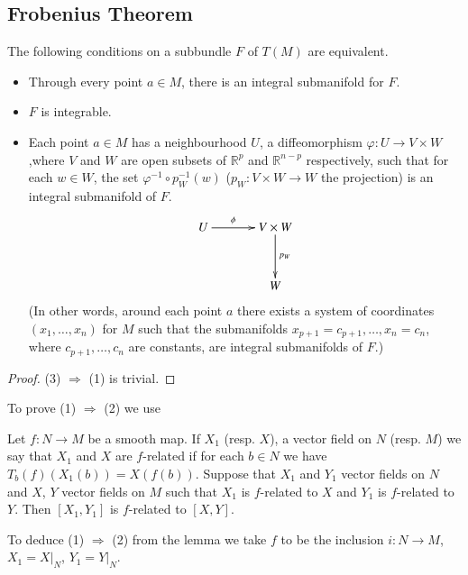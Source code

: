 \subsection*{Frobenius Theorem}

\begin{theorem}\label{sec8-thm8.1}
The following conditions on a subbundle $F$ of $T(M)$ are equivalent.
\begin{itemize}
\item[\rm(1)] Through every point $a\in M$, there is an integral submanifold for $F$.

\item[\rm(2)] $F$ is integrable.

\item[\rm(3)] Each point $a\in M$ has a neighbourhood $U$, a diffeomorphism $\varphi:U\to V\times W$,\pageoriginale where $V$ and $W$ are open subsets of $\mathbb{R}^{p}$ and $\mathbb{R}^{n-p}$ respectively, such that for each $w\in W$, the set $\varphi^{-1}\circ p^{-1}_{W}(w)$ ($p_{W}:V\times W\to W$ the projection) is an integral submanifold of $F$.
\[
\xymatrix@=1.2cm{
U\ar[r]^-{\phi} & V\times W\ar[d]^-{p_{W}}\\
             & W
}
\]
(In other words, around each point $a$ there exists a system of coordinates $(x_{1},\ldots,x_{n})$ for $M$ such that the submanifolds $x_{p+1}=c_{p+1},\ldots,x_{n}=c_{n}$, where $c_{p+1},\ldots,c_{n}$ are constants, are integral submanifolds of $F$.)
\end{itemize}
\end{theorem}

\begin{proof}
(3) $\Rightarrow$ (1) is trivial.
\end{proof}

To prove (1) $\Rightarrow$ (2) we use

\begin{lemma}\label{sec8-lem8.2}
Let $f:N\to M$ be a smooth map. If $X_{1}$ (resp. $X$), a vector field on $N$ (resp. $M$) we say that $X_{1}$ and $X$ are $f$-related if for each $b\in N$ we have $T_{b}(f)(X_{1}(b))=X(f(b))$. Suppose that $X_{1}$ and $Y_{1}$ vector fields on $N$ and $X$, $Y$ vector fields on $M$ such that $X_{1}$ is $f$-related to $X$ and $Y_{1}$ is $f$-related to $Y$. Then $[X_{1},Y_{1}]$ is $f$-related to $[X,Y]$.
\end{lemma}

To deduce (1) $\Rightarrow$ (2) from the lemma we take $f$ to be the inclusion $i:N\to M$, $X_{1}=X|_{N}$, $Y_{1}=Y|_{N}$.

